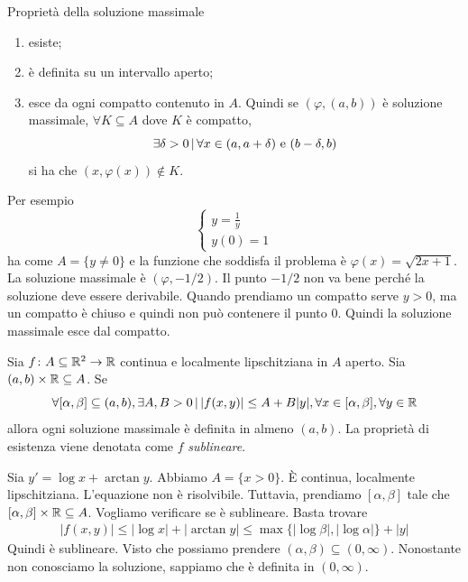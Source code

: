 \documentclass[a4paper]{article}
\begin{document}
\begin{snippetproposition}{Proprietà della soluzione massimale}
    \begin{enumerate}
        \item esiste;
        \item è definita su un intervallo aperto;
        \item esce da ogni compatto contenuto in \(A\).
        Quindi se \((\varphi, (a,b))\) è soluzione massimale, \(\forall K \subseteq A\)
        dove \(K\) è compatto,
        \[
            \exists \delta >0 \,|\, \forall x \in (a, a+\delta) \text{ e } (b-\delta, b)
        \]
        si ha che \((x, \varphi(x)) \notin K\).
    \end{enumerate}
\end{snippetproposition}

\begin{snippetexample}{}
    Per esempio
    \[
        \begin{cases}
            y = \frac{1}{y} \\
            y(0) = 1
        \end{cases}
    \]
    ha come \(A = \{y \neq 0\}\) e la funzione che soddisfa il problema è
    \(\varphi(x) = \sqrt{2x + 1}\). La soluzione massimale è \((\varphi, -1/2)\).
    Il punto \(-1/2\) non va bene perché la soluzione deve essere derivabile.
    Quando prendiamo un compatto serve \(y>0\), ma un compatto è chiuso e quindi non può contenere il punto \(0\).
    Quindi la soluzione massimale esce dal compatto.
\end{snippetexample}

\begin{snippettheorem}{}
    Sia \(f \colon A \subseteq \mathbb{R}^2 \to \mathbb{R}\) continua e localmente
    lipschitziana in \(A\) aperto.
    Sia \((a,b) \times \mathbb{R} \subseteq A\). Se
    \[
        \forall [\alpha, \beta] \subseteq (a,b), \exists A,B>0 \,|\,
        |f(x,y)| \leq A + B|y|, \forall x\in [\alpha, \beta], \forall y \in \mathbb{R}
    \]
    allora ogni soluzione massimale è definita in almeno \((a,b)\).
    La proprietà di esistenza viene denotata come \(f\) \emph{sublineare}.
\end{snippettheorem}

\begin{snippetexample}{}
    Sia \(y' = \log x + \arctan y\). Abbiamo \(A = \{x>0\}\). È continua, localmente lipschitziana.
    L'equazione non è risolvibile. Tuttavia, prendiamo \([\alpha, \beta]\)
    tale che \([\alpha, \beta] \times \mathbb{R} \subseteq A\).
    Vogliamo verificare se è sublineare. Basta trovare
    \begin{align*}
        |f(x,y)| \leq |\log x| + |\arctan y| \leq \max\{|\log \beta|, |\log \alpha|\} + |y|
    \end{align*}
    Quindi è sublineare. Visto che possiamo prendere \((\alpha, \beta) \subseteq (0, \infty)\).
    Nonostante non conosciamo la soluzione, sappiamo che è definita in \((0, \infty)\).
\end{snippetexample}
\end{document}
